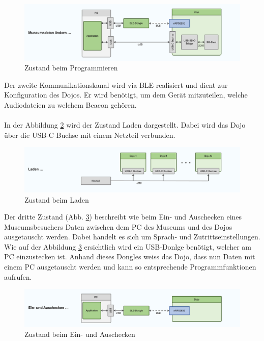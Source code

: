\documentclass[10pt,a4paper,oneside]{99_fhnwreport}
\begin{document}
\begin{figure}[htb]
\includegraphics[width=\textwidth]{Zustand_Programmieren.png}
\caption{Zustand beim Programmieren} %
\label{fig:image3}
\end{figure}

Der zweite Kommunikationskanal wird via BLE realisiert und dient zur Konfiguration des Dojos. Er wird benötigt, um dem Gerät mitzuteilen, welche Audiodateien zu welchem Beacon gehören.\\
\\
In der Abbildung \ref{fig:image2} wird der Zustand Laden dargestellt. Dabei wird das Dojo über die USB-C Buchse mit einem Netzteil verbunden.

\begin{figure}[htb]
\includegraphics[width=\textwidth]{Zustand_Laden.png}
\caption{Zustand beim Laden} %
\label{fig:image2}
\end{figure}

Der dritte Zustand (Abb. \ref{fig:image1}) beschreibt wie beim Ein- und Auschecken eines Museumsbesuchers Daten zwischen dem PC des Museums und des Dojos ausgetauscht werden. Dabei handelt es sich um Sprach- und Zutrittseinstellungen. Wie auf der Abbildung \ref{fig:image1} ersichtlich wird ein USB-Donlge benötigt, welcher am PC einzustecken ist. Anhand dieses Dongles weiss das Dojo, dass nun Daten mit einem PC ausgetauscht werden und kann so entsprechende Programmfunktionen aufrufen.
\newpage

\begin{figure}[htb]
\includegraphics[width=\textwidth]{Zustand_Ein_Aus_Checken.png}
\caption{Zustand beim Ein- und Auschecken} %
\label{fig:image1}
\end{figure}
\end{document}
